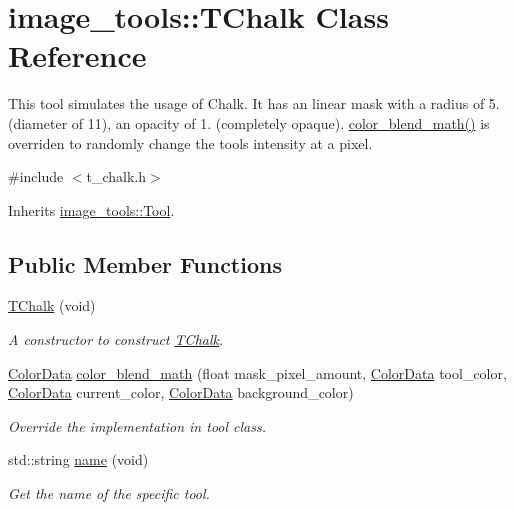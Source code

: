 \hypertarget{classimage__tools_1_1TChalk}{}\section{image\+\_\+tools\+:\+:T\+Chalk Class Reference}
\label{classimage__tools_1_1TChalk}


This tool simulates the usage of Chalk. It has an linear mask with a radius of 5. (diameter of 11), an opacity of 1. (completely opaque). \hyperlink{classimage__tools_1_1TChalk_a3cda7adc97a776c6575452f9d983eff5}{color\+\_\+blend\+\_\+math()} is overriden to randomly change the tool\textquotesingle{}s intensity at a pixel.  




{\ttfamily \#include $<$t\+\_\+chalk.\+h$>$}



Inherits \hyperlink{classimage__tools_1_1Tool}{image\+\_\+tools\+::\+Tool}.

\subsection*{Public Member Functions}
\begin{DoxyCompactItemize}
\item 
\hyperlink{classimage__tools_1_1TChalk_a6ff406e82e02ded10e1e360fd8304cd1}{T\+Chalk} (void)\hypertarget{classimage__tools_1_1TChalk_a6ff406e82e02ded10e1e360fd8304cd1}{}\label{classimage__tools_1_1TChalk_a6ff406e82e02ded10e1e360fd8304cd1}

\begin{DoxyCompactList}\small\item\em A constructor to construct \hyperlink{classimage__tools_1_1TChalk}{T\+Chalk}. \end{DoxyCompactList}\item 
\hyperlink{classimage__tools_1_1ColorData}{Color\+Data} \hyperlink{classimage__tools_1_1TChalk_a3cda7adc97a776c6575452f9d983eff5}{color\+\_\+blend\+\_\+math} (float mask\+\_\+pixel\+\_\+amount, \hyperlink{classimage__tools_1_1ColorData}{Color\+Data} tool\+\_\+color, \hyperlink{classimage__tools_1_1ColorData}{Color\+Data} current\+\_\+color, \hyperlink{classimage__tools_1_1ColorData}{Color\+Data} background\+\_\+color)\hypertarget{classimage__tools_1_1TChalk_a3cda7adc97a776c6575452f9d983eff5}{}\label{classimage__tools_1_1TChalk_a3cda7adc97a776c6575452f9d983eff5}

\begin{DoxyCompactList}\small\item\em Override the implementation in tool class. \end{DoxyCompactList}\item 
std\+::string \hyperlink{classimage__tools_1_1TChalk_a74f65065dbc618e5f30089597d39bb46}{name} (void)
\begin{DoxyCompactList}\small\item\em Get the name of the specific tool. \end{DoxyCompactList}\end{DoxyCompactItemize}
